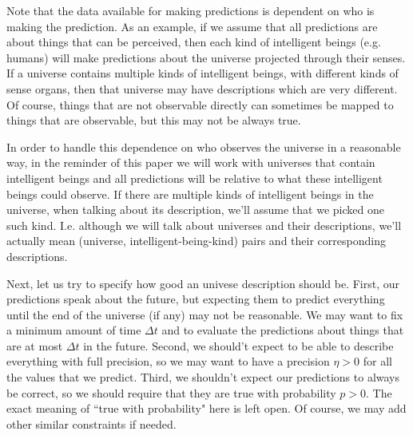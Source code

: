 \documentclass[a4paper
,draft
]{article}
\newcommand{\ghilimele}[1]{``#1"}
\begin{document}
Note that the data available for making predictions is dependent
on who is making the prediction. As an example, if we assume that
all predictions are about things that can be perceived, then
each kind of intelligent beings (e.g. humans) will make predictions
about the universe projected through their senses. If a universe contains
multiple kinds of intelligent beings, with different kinds of
sense organs, then that universe may have descriptions which are
very different.
Of course, things that are not observable directly can sometimes be mapped
to things that are observable, but this may not be always true.

In order to handle this dependence on who observes the universe
in a reasonable way, in the reminder of this paper we will work with universes
that contain intelligent beings
and all predictions will be relative to what these intelligent beings
could observe.
If there are multiple kinds of intelligent beings in the
universe, when talking about its description, we'll assume that we picked
one such kind.
I.e. although we
will talk about universes and their descriptions, we'll actually mean
(universe, intelligent-being-kind) pairs and their corresponding descriptions.

Next, let us try to specify how good an univese description
should be. First, our predictions speak about the future, but expecting them to
predict everything until the end of the universe (if any) may not be
reasonable. We may want to fix a minimum amount of time $\Delta t$
and to evaluate the predictions about things that are at most
$\Delta t$ in the future. Second, we should't expect to
be able to describe everything with full precision, so we may want to
have a precision $\eta>0$ for all the values that we predict.
Third, we shouldn't expect our predictions to always be correct, so
we should require that they are true with probability $p>0$.
The exact meaning of \ghilimele{true with probability} here is left open.
Of course, we may add other similar constraints if needed.
\end{document}
